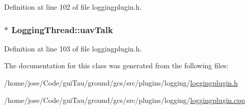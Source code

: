 Definition at line 102 of file loggingplugin.\-h.

\hypertarget{class_logging_thread_a0dfed803383ab861a16c748421396306}{
\subsubsection[{uav\-Talk}]{$\ast$ Logging\-Thread\-::uav\-Talk\hspace{0.3cm}{\ttfamily [protected]}}}\label{class_logging_thread_a0dfed803383ab861a16c748421396306}


Definition at line 103 of file loggingplugin.\-h.



The documentation for this class was generated from the following files\-:\begin{DoxyCompactItemize}
\item 
/home/jose/\-Code/gui\-Tau/ground/gcs/src/plugins/logging/\hyperlink{loggingplugin_8h}{loggingplugin.\-h}\item 
/home/jose/\-Code/gui\-Tau/ground/gcs/src/plugins/logging/\hyperlink{loggingplugin_8cpp}{loggingplugin.\-cpp}\end{DoxyCompactItemize}
